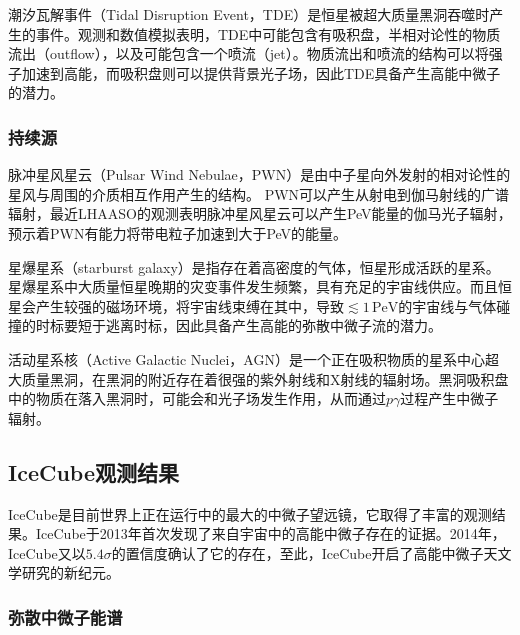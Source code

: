 潮汐瓦解事件（Tidal Disruption Event，TDE）是恒星被超大质量黑洞吞噬时产生的事件。观测和数值模拟表明，TDE中可能包含有吸积盘，半相对论性的物质流出（outflow），以及可能包含一个喷流（jet）\cite{Dai_TDE:2018}。物质流出和喷流的结构可以将强子加速到高能，而吸积盘则可以提供背景光子场，因此TDE具备产生高能中微子的潜力\cite{Wu_TDE:2021, Zheng_TDE:2022, Winter_TDE:2022}。

\subsubsection{持续源}

脉冲星风星云（Pulsar Wind Nebulae，PWN）是由中子星向外发射的相对论性的星风与周围的介质相互作用产生的结构\cite{Mitchell_PWN:2022}。
PWN可以产生从射电到伽马射线的广谱辐射，最近LHAASO的观测表明脉冲星风星云可以产生PeV能量的伽马光子辐射\cite{LHAASO_Crab:2021}，预示着PWN有能力将带电粒子加速到大于PeV的能量。

星爆星系（starburst galaxy）是指存在着高密度的气体，恒星形成活跃的星系。星爆星系中大质量恒星晚期的灾变事件发生频繁，具有充足的宇宙线供应。而且恒星会产生较强的磁场环境，将宇宙线束缚在其中，导致$\lesssim 1\,\mathrm{PeV}$的宇宙线与气体碰撞的时标要短于逃离时标，因此具备产生高能的弥散中微子流的潜力\cite{Loeb_starburst_galaxy:2006}。

活动星系核（Active Galactic Nuclei，AGN）是一个正在吸积物质的星系中心超大质量黑洞，在黑洞的附近存在着很强的紫外射线和X射线的辐射场。黑洞吸积盘中的物质在落入黑洞时，可能会和光子场发生作用，从而通过$p\gamma$过程产生中微子辐射\cite{Meszaros_AGN:2004, Murase_AGN:2015, Murase_AGN:2022, Murase_hidden_AGN:2022}。


\subsection{IceCube观测结果}

IceCube是目前世界上正在运行中的最大的中微子望远镜，它取得了丰富的观测结果。IceCube于2013年首次发现了来自宇宙中的高能中微子存在的证据\cite{IceCube_astro_neutrino_flux:2013}。2014年，IceCube又以$5.4\sigma$的置信度确认了它的存在\cite{IceCube_astro_neutrino_flux_3yr:2014}，至此，IceCube开启了高能中微子天文学研究的新纪元。

\subsubsection{弥散中微子能谱}

